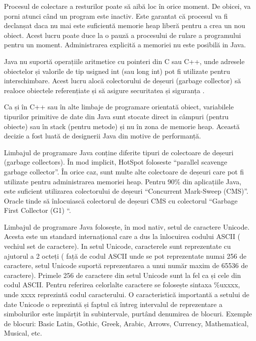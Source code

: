 \documentclass[12pt]{book}
\begin{document}
Procesul de colectare a resturilor poate să aibă loc în orice moment. De obicei, va porni atunci când un program este inactiv. Este garantat că procesul va fi declanșat daca nu mai este suficientă memorie heap liberă pentru a crea un nou obiect. Acest lucru poate duce la o pauză a procesului de rulare a programului pentru un moment. Administrarea explicită a memoriei nu este posibilă in Java.\cite{thinkJava}

Java nu suportă operațiile aritmetice cu pointeri din C sau C++, unde adresele obiectelor și valorile de tip usigned int (sau long int) pot fi utilizate pentru interschimbare. Acest lucru alocă colectorului de deșeuri (garbage collector) să realoce obiectele referențiate și să asigure securitatea și siguranța .

Ca și în C++ sau în alte limbaje de programare orientată obiect, variabilele tipurilor primitive de date din Java sunt stocate direct in câmpuri (pentru obiecte) sau în stack (pentru metode) și nu în zona de memorie heap. Această decizie a fost luată de designerii Java din motive de performanță.

Limbajul de programare Java conține diferite tipuri de colectoare de deșeuri (garbage collectors). În mod implicit, HotSpot foloseste “parallel scavenge garbage collector”. În orice caz, sunt multe alte colectoare de deșeuri care pot fi utilizate pentru administrarea memoriei heap. Pentru 90\%  din aplicațiile Java, este suficient utilizarea colectorului de deșeuri “Concurrent Mark-Sweep (CMS)”. Oracle tinde să înlocuiască colectorul de deșeuri CMS cu colectorul “Garbage First Collector (G1) “.\cite{thinkJava}

Limbajul de programare Java folosește, în mod nativ, setul de caractere Unicode. Acesta este un standard internațional care a dus la înlocuirea codului ASCII ( vechiul set de caractere). In setul Unicode, caracterele sunt reprezentate cu ajutorul a 2 octeți ( față de codul ASCII unde se pot reprezentate numai 256 de caractere, setul Unicode suportă reprezentarea a unui număr maxim de 65536 de caractere). Primele 256 de caractere din setul Unicode sunt la fel ca și cele din codul ASCII. Pentru referirea celorlalte caractere se folosește sintaxa \%uxxxx, unde xxxx reprezintă codul caracterului. O caracteristică importantă a setului de date Unicode o reprezintă și faptul că întreg intervalul de reprezentare a simbolurilor este împărțit în subintervale, purtând denumirea de blocuri. Exemple de blocuri: Basic Latin, Gothic, Greek, Arabic, Arrows, Currency, Mathematical, Musical, etc. \cite{cursPracticJava}
\end{document}
